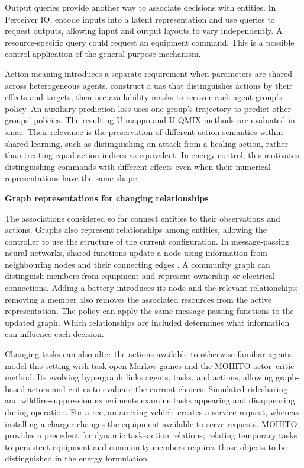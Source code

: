 Output queries provide another way to associate decisions with entities. In Perceiver IO, \textcite{jaegle2022perceiver} encode inputs into a latent representation and use queries to request outputs, allowing input and output layouts to vary independently. A resource-specific query could request an equipment command. This is a possible control application of the general-purpose mechanism.

Action meaning introduces a separate requirement when parameters are shared across heterogeneous agents. \textcite{yu2024uas} construct a \gls{uas} that distinguishes actions by their effects and targets, then use availability masks to recover each agent group's policy. An auxiliary prediction loss uses one group's trajectory to predict other groups' policies. The resulting U-\gls{mappo} and U-QMIX methods are evaluated in \gls{smac}. Their relevance is the preservation of different action semantics within shared learning, such as distinguishing an attack from a healing action, rather than treating equal action indices as equivalent. In energy control, this motivates distinguishing commands with different effects even when their numerical representations have the same shape.

\smallskip
\noindent\textbf{Graph representations for changing relationships}\par\nobreak\smallskip
The associations considered so far connect entities to their observations and actions. Graphs also represent relationships among entities, allowing the controller to use the structure of the current configuration. In message-passing neural networks, shared functions update a node using information from neighbouring nodes and their connecting edges \parencite{gilmer2017mpnn}. A community graph can distinguish members from equipment and represent ownership or electrical connections. Adding a battery introduces its node and the relevant relationships; removing a member also removes the associated resources from the active representation. The policy can apply the same message-passing functions to the updated graph. Which relationships are included determines what information can influence each decision.

Changing tasks can also alter the actions available to otherwise familiar agents. \textcite{anil2025mohito} model this setting with task-open Markov games and the MOHITO actor--critic method. Its evolving hypergraph links agents, tasks, and actions, allowing graph-based actors and critics to evaluate the current choices. Simulated ridesharing and wildfire-suppression experiments examine tasks appearing and disappearing during operation. For a \gls{rec}, an arriving vehicle creates a service request, whereas installing a charger changes the equipment available to serve requests. MOHITO provides a precedent for dynamic task--action relations; relating temporary tasks to persistent equipment and community members requires those objects to be distinguished in the energy formulation.

